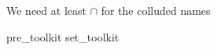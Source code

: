 
We need at least $\cap$ for the colluded names
\begin{zsection}
   \SECTION pre\_toolkit \parents set\_toolkit
\end{zsection}
